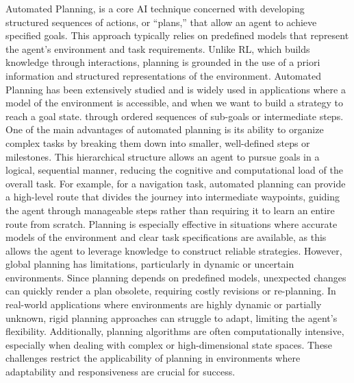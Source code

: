 Automated Planning, is a core AI technique concerned with developing structured sequences of actions, or “plans,” 
that allow an agent to achieve specified goals. 
This approach typically relies on predefined models that represent the agent’s environment and task requirements.
Unlike RL, which builds knowledge through interactions, planning is grounded in the use of a priori information and
structured representations of the environment.
Automated Planning has been extensively studied and is widely used in applications where a model of the environment is accessible,
and when we want to build a strategy to reach a goal state.
through ordered sequences of sub-goals or intermediate steps.
One of the main advantages of automated planning is its ability to organize complex tasks by breaking them down into
smaller, well-defined steps or milestones.
This hierarchical structure allows an agent to pursue goals in a logical, sequential manner, reducing the cognitive
and computational load of the overall task.
For example, for a navigation task, automated planning can provide a high-level route that divides the journey into intermediate
waypoints, guiding the agent through manageable steps rather than requiring it to learn an entire route from scratch.
Planning is especially effective in situations where accurate models of the environment and clear task specifications
are available, as this allows the agent to leverage knowledge to construct reliable strategies.
However, global planning has limitations, particularly in dynamic or uncertain environments.
Since planning depends on predefined models, unexpected changes can quickly render a plan obsolete, requiring costly
revisions or re-planning.
In real-world applications where environments are highly dynamic or partially unknown, rigid planning approaches can
struggle to adapt, limiting the agent’s flexibility.
Additionally, planning algorithms are often computationally intensive, especially when dealing with complex or
high-dimensional state spaces.
These challenges restrict the applicability of planning in environments where adaptability and responsiveness are
crucial for success.

